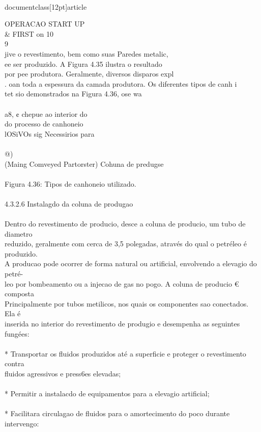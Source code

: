 \\documentclass[12pt]{article}
\begin{document}
OPERACAO START UP \\& FIRST on 10\\
9\\
jive o revestimento, bem como suas Paredes metalic,\\
ee ser produzido. A Figura 4.35 ilustra o resultado\\
por pee produtora. Geralmente, diversos disparos expl\\
. oan toda a espessura da camada produtora. Os diferentes tipos de canh i\\
tet sio demonstrados na Figura 4.36, ose wa\\
\\
a8, ¢ chepue ao interior do\\
do processo de canhoneio\\
lOSiVOs sig Necessirios para\\
\\
@)\\
(Maing Comveyed Partorster) Cohuna de predugse\\
\\
Figura 4.36: Tipos de canhoneio utilizado.\\
\\
4.3.2.6 Instalagdo da coluna de produgao\\
\\
Dentro do revestimento de producio, desce a coluna de producio, um tubo de diametro\\
reduzido, geralmente com cerca de 3,5 polegadas, através do qual o petréleo é produzido.\\
A producao pode ocorrer de forma natural ou artificial, envolvendo a elevagio do petré-\\
leo por bombeamento ou a injecao de gas no pogo. A coluna de producio € composta\\
Principalmente por tubos metilicos, nos quais os componentes sao conectados. Ela é\\
inserida no interior do revestimento de produgio e desempenha as seguintes fungées:\\
\\
* Transportar os fluidos produzidos até a superficie e proteger o revestimento contra\\
fluidos agressivos e press6es elevadas;\\
\\
* Permitir a instalacdo de equipamentos para a elevagio artificial;\\
\\
* Facilitara circulagao de fluidos para o amortecimento do poco durante intervengo:\\
\end{document}
